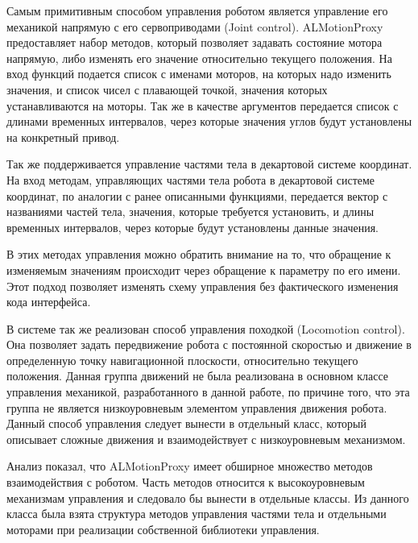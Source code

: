 Самым примитивным способом управления роботом является управление его механикой напрямую с его сервоприводами (Joint control).  ALMotionProxy предоставляет набор методов, который позволяет задавать состояние мотора напрямую, либо изменять его значение относительно текущего положения. На вход функций подается список с именами моторов, на которых надо изменить значения, и список чисел с плавающей точкой, значения которых устанавливаются на моторы. Так же в качестве аргументов передается список с длинами временных интервалов, через которые значения углов будут установлены на конкретный привод.

Так же поддерживается управление частями тела в декартовой системе координат. На вход методам, управляющих частями тела робота в декартовой системе координат, по аналогии с ранее описанными функциями, передается вектор с названиями частей тела, значения, которые требуется установить, и длины временных интервалов, через которые будут установлены данные значения.

В этих методах управления можно обратить внимание на то, что обращение к изменяемым значениям происходит через обращение к параметру по его имени. Этот подход позволяет изменять схему управления без фактического изменения кода интерфейса.

В системе так же реализован способ управления походкой (Locomotion control). Она позволяет задать передвижение робота с постоянной скоростью и движение в определенную точку навигационной плоскости, относительно текущего положения. Данная группа движений не была реализована в основном классе управления механикой, разработанного в данной работе, по причине того, что эта группа не является низкоуровневым элементом управления движения робота. Данный способ управления следует вынести в отдельный класс, который описывает сложные движения и взаимодействует с низкоуровневым механизмом.

Анализ показал, что ALMotionProxy имеет обширное множество методов взаимодействия с роботом. Часть методов относится к высокоуровневым механизмам управления и следовало бы вынести в отдельные классы. Из данного класса была взята структура методов управления частями тела и отдельными моторами при реализации собственной библиотеки управления.